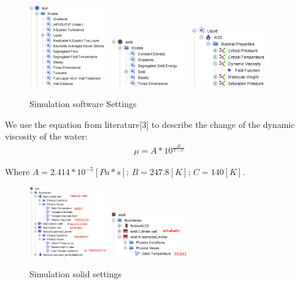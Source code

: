 \documentclass[journal,article,processes,submit,moreauthors,pdftex]{Definitions/mdpi}
\begin{document}
\begin{figure}
\begin{center}
\centerline{\includegraphics[width=0.3\textwidth]{./docu_pictures/software1.png} \includegraphics[width=0.3\textwidth]{./docu_pictures/software2.png}
\includegraphics[width=0.3\textwidth]{./docu_pictures/software3.png}}
\end{center}
\caption{Simulation software Settings}
\label{software-settings}
\end{figure}

We use the equation from literature[3] to describe the change of the dynamic viscosity of the water: 
\begin{align*}
    \mu=A*10^{\frac{B}{T-C}}
\end{align*}

Where $A=2.414*10^{-5}[Pa*s]$; $B=247.8[K]$; $C=140[K]$.

\begin{figure}
\begin{center}
\centerline{\includegraphics[width=0.3\textwidth]{./docu_pictures/solid1.png} \includegraphics[width=0.3\textwidth]{./docu_pictures/solid2.png}}
\end{center}
\caption{Simulation solid settings}
\label{solid-settings}
\end{figure}
\end{document}
